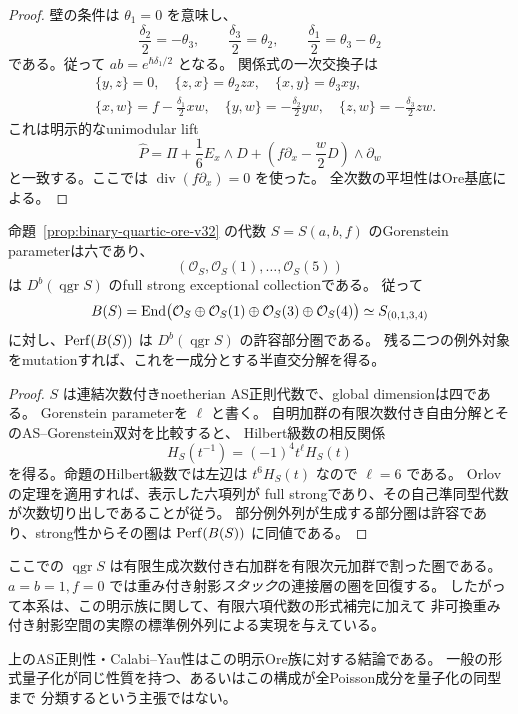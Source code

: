 \begin{proof}
壁の条件は $\theta_1=0$ を意味し、
\[
 \frac{\delta_2}{2}=-\theta_3,\qquad
 \frac{\delta_3}{2}=\theta_2,\qquad
 \frac{\delta_1}{2}=\theta_3-\theta_2
\]
である。従って $ab=e^{\hbar\delta_1/2}$ となる。
関係式の一次交換子は
\begin{align*}
 &\{y,z\}=0,\quad\{z,x\}=\theta_2zx,
       \quad\{x,y\}=\theta_3xy,\\
 &\{x,w\}=f-\frac{\delta_1}{2}xw,
 \quad\{y,w\}=-\frac{\delta_2}{2}yw,
 \quad\{z,w\}=-\frac{\delta_3}{2}zw.
\end{align*}
これは明示的なunimodular lift
\[
 \widehat P=\Pi+\frac16E_x\wedge D+
       \left(f\partial_x-\frac w2D\right)\wedge\partial_w
\]
と一致する。ここでは $\operatorname{div}(f\partial_x)=0$ を使った。
全次数の平坦性はOre基底による。
\end{proof}


\begin{corollary}[標準六項列とVK部分圏の実現]
\label{cor:ore-six-objects-v32}
命題~\ref{prop:binary-quartic-ore-v32} の代数 $S=S(a,b,f)$ のGorenstein parameterは六であり、
\[
 (\mathcal O_S,\mathcal O_S(1),\ldots,\mathcal O_S(5))
\]
は $D^b(\operatorname{qgr}S)$ のfull strong exceptional collectionである。
従って
\[
 B(S)=\operatorname{End}\bigl(\mathcal O_S\oplus\mathcal O_S(1)
              \oplus\mathcal O_S(3)\oplus\mathcal O_S(4)\bigr)
       \simeq S_{(0,1,3,4)}
\]
に対し、$\operatorname{Perf}(B(S))$ は $D^b(\operatorname{qgr}S)$ の許容部分圏である。
残る二つの例外対象をmutationすれば、これを一成分とする半直交分解を得る。
\end{corollary}

\begin{proof}
$S$ は連結次数付きnoetherian AS正則代数で、global dimensionは四である。
Gorenstein parameterを $\ell$ と書く。
自明加群の有限次数付き自由分解とそのAS--Gorenstein双対を比較すると、
Hilbert級数の相反関係
\[
 H_S(t^{-1})=(-1)^4t^\ell H_S(t)
\]
を得る。命題のHilbert級数では左辺は $t^6H_S(t)$ なので $\ell=6$ である。
Orlovの定理\cite[Corollary 2.7]{Orlov2009}を適用すれば、表示した六項列が
full strongであり、その自己準同型代数が次数切り出しであることが従う。
部分例外列が生成する部分圏は許容であり、strong性からその圏は $\operatorname{Perf}(B(S))$ に同値である。
\end{proof}

ここでの $\operatorname{qgr}S$ は有限生成次数付き右加群を有限次元加群で割った圏である。
$a=b=1,f=0$ では重み付き射影\emph{スタック}の連接層の圏を回復する。
したがって本系は、この明示族に関して、有限六項代数の形式補完に加えて
非可換重み付き射影空間の実際の標準例外列による実現を与えている。

上のAS正則性・Calabi--Yau性はこの明示Ore族に対する結論である。
一般の形式量子化が同じ性質を持つ、あるいはこの構成が全Poisson成分を量子化の同型まで
分類するという主張ではない。
